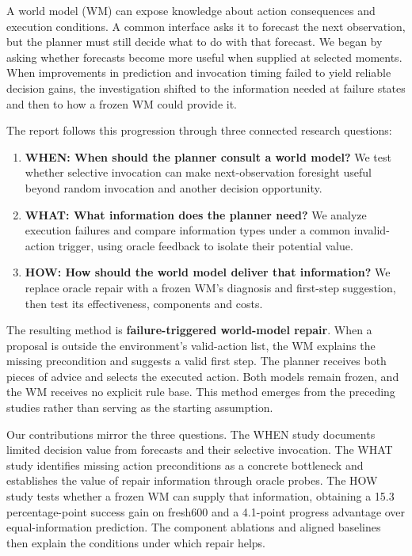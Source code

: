 \documentclass[runningheads]{llncs}
\begin{document}
A world model (WM) can expose knowledge about action consequences and execution conditions. A common interface asks it to forecast the next observation, but the planner must still decide what to do with that forecast. We began by asking whether forecasts become more useful when supplied at selected moments. When improvements in prediction and invocation timing failed to yield reliable decision gains, the investigation shifted to the information needed at failure states and then to how a frozen WM could provide it.

The report follows this progression through three connected research questions:
\begin{enumerate}
\item \textbf{WHEN: When should the planner consult a world model?} We test whether selective invocation can make next-observation foresight useful beyond random invocation and another decision opportunity.
\item \textbf{WHAT: What information does the planner need?} We analyze execution failures and compare information types under a common invalid-action trigger, using oracle feedback to isolate their potential value.
\item \textbf{HOW: How should the world model deliver that information?} We replace oracle repair with a frozen WM's diagnosis and first-step suggestion, then test its effectiveness, components and costs.
\end{enumerate}

The resulting method is \textbf{failure-triggered world-model repair}. When a proposal is outside the environment's valid-action list, the WM explains the missing precondition and suggests a valid first step. The planner receives both pieces of advice and selects the executed action. Both models remain frozen, and the WM receives no explicit rule base. This method emerges from the preceding studies rather than serving as the starting assumption.

Our contributions mirror the three questions. The WHEN study documents limited decision value from forecasts and their selective invocation. The WHAT study identifies missing action preconditions as a concrete bottleneck and establishes the value of repair information through oracle probes. The HOW study tests whether a frozen WM can supply that information, obtaining a 15.3 percentage-point success gain on fresh600 and a 4.1-point progress advantage over equal-information prediction. The component ablations and aligned baselines then explain the conditions under which repair helps.
\end{document}
